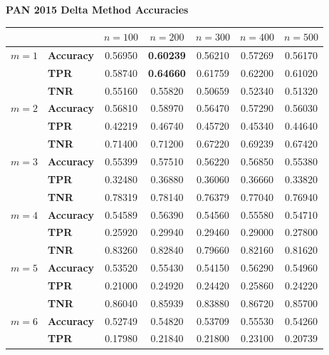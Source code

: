 \begin{table}
    \centering
    \textbf{PAN 2015 Delta Method Accuracies}\par\medskip
    \begin{tabular}{c|lccccc}
               &                   & $n=100$ & $n=200$ & $n=300$ & $n=400$ & $n=500$ \\
        \hline
        $m=1$  & \textbf{Accuracy} & 0.56950 & \textbf{0.60239} & 0.56210 & 0.57269 & 0.56170 \\
               & \textbf{TPR}      & 0.58740 & \textbf{0.64660} & 0.61759 & 0.62200 & 0.61020 \\
               & \textbf{TNR}      & 0.55160 & 0.55820 & 0.50659 & 0.52340 & 0.51320 \\
        \hline
        $m=2$  & \textbf{Accuracy} & 0.56810 & 0.58970 & 0.56470 & 0.57290 & 0.56030 \\
               & \textbf{TPR}      & 0.42219 & 0.46740 & 0.45720 & 0.45340 & 0.44640 \\
               & \textbf{TNR}      & 0.71400 & 0.71200 & 0.67220 & 0.69239 & 0.67420 \\
        \hline
        $m=3$  & \textbf{Accuracy} & 0.55399 & 0.57510 & 0.56220 & 0.56850 & 0.55380 \\
               & \textbf{TPR}      & 0.32480 & 0.36880 & 0.36060 & 0.36660 & 0.33820 \\
               & \textbf{TNR}      & 0.78319 & 0.78140 & 0.76379 & 0.77040 & 0.76940 \\
        \hline
        $m=4$  & \textbf{Accuracy} & 0.54589 & 0.56390 & 0.54560 & 0.55580 & 0.54710 \\
               & \textbf{TPR}      & 0.25920 & 0.29940 & 0.29460 & 0.29000 & 0.27800 \\
               & \textbf{TNR}      & 0.83260 & 0.82840 & 0.79660 & 0.82160 & 0.81620 \\
        \hline
        $m=5$  & \textbf{Accuracy} & 0.53520 & 0.55430 & 0.54150 & 0.56290 & 0.54960 \\
               & \textbf{TPR}      & 0.21000 & 0.24920 & 0.24420 & 0.25860 & 0.24220 \\
               & \textbf{TNR}      & 0.86040 & 0.85939 & 0.83880 & 0.86720 & 0.85700 \\
        \hline
        $m=6$  & \textbf{Accuracy} & 0.52749 & 0.54820 & 0.53709 & 0.55530 & 0.54260 \\
               & \textbf{TPR}      & 0.17980 & 0.21840 & 0.21800 & 0.23100 & 0.20739 \\

\end{tabular}
\end{table}
